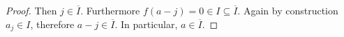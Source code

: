 \documentclass[8pt]{article}
\numberwithin{equation}{section}
\begin{document}
\begin{proof}
    Then $j\in \overline{I}$. Furthermore $f(a-j) = 0\in I\subseteq\overline{I}$. Again by construction $a_j\in I$, therefore $a-j\in\overline{I}$. In particular, $a\in\overline{I}$.%
\end{proof}
\end{document}
